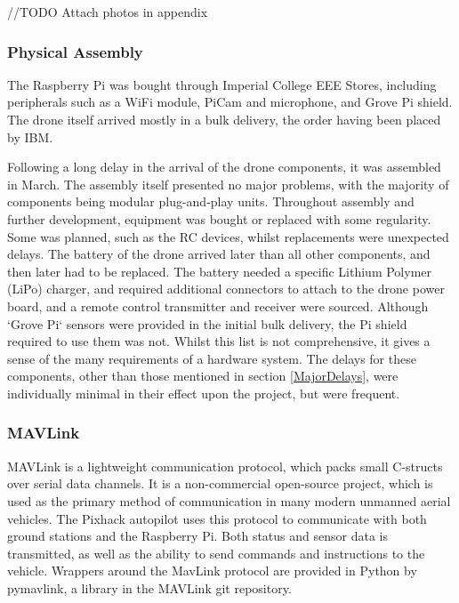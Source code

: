 \documentclass{article}
\begin{document}
//TODO Attach photos in appendix

\subsubsection{Physical Assembly}
The Raspberry Pi was bought through Imperial College EEE Stores, including peripherals such as a WiFi module, PiCam and microphone, and Grove Pi shield. The drone itself arrived mostly in a bulk delivery, the order having been placed by IBM. 

Following a long delay in the arrival of the drone components, it was assembled in March. The assembly itself presented no major problems, with the majority of components being modular plug-and-play units. Throughout assembly and further development, equipment was bought or replaced with some regularity. Some was planned, such as the RC devices, whilst replacements were unexpected delays. The battery of the drone arrived later than all other components, and then later had to be replaced. The battery needed a specific Lithium Polymer (LiPo) charger, and required additional connectors to attach to the drone power board, and a remote control transmitter and receiver were sourced. Although `Grove Pi` sensors were provided in the initial bulk delivery, the Pi shield required to use them was not. Whilst this list is not comprehensive, it gives a sense of the many requirements of a hardware system. The delays for these components, other than those mentioned in section \ref{MajorDelays}, were individually minimal in their effect upon the project, but were frequent. 

\subsubsection{MAVLink}
MAVLink is a lightweight communication protocol, which packs small C-structs over serial data channels\cite{qGroundMavlink}. It is a non-commercial open-source project, which is used as the primary method of communication in many modern unmanned aerial vehicles. The Pixhack autopilot uses this protocol to communicate with both ground stations and the Raspberry Pi. Both status and sensor data is transmitted, as well as the ability to send commands and instructions to the vehicle. Wrappers around the MavLink protocol are provided in Python by pymavlink, a library in the MAVLink git repository.
\end{document}
